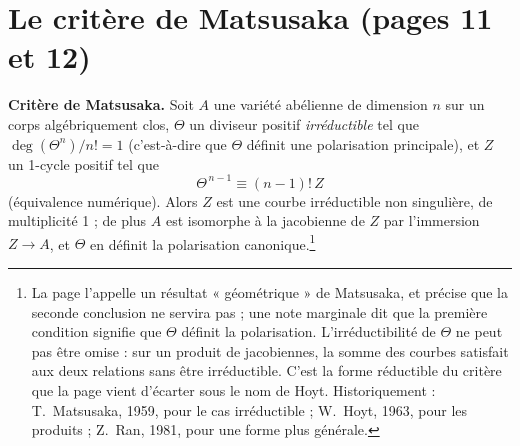 \documentclass[11pt,a4paper]{article}
\begin{document}
\section*{Le critère de Matsusaka (pages 11 et 12)}

\textbf{Critère de Matsusaka.} Soit $A$ une variété abélienne de dimension $n$
sur un corps algébriquement clos, $\Theta$ un diviseur positif
\emph{irréductible} tel que $\deg(\Theta^{n})/n! = 1$ (c'est-à-dire que
$\Theta$ définit une polarisation principale), et $Z$ un 1-cycle positif
tel que
\[
  \Theta^{\,n-1} \equiv (n-1)!\, Z
\]
(équivalence numérique). Alors $Z$ est une courbe irréductible non singulière,
de multiplicité 1 ; de plus $A$ est isomorphe à la jacobienne de $Z$ par
l'immersion $Z \to A$, et $\Theta$ en définit la polarisation
canonique.\footnote{La page l'appelle un résultat « géométrique » de
Matsusaka, et précise que la seconde conclusion ne servira pas ; une note
marginale dit que la première condition signifie que $\Theta$ définit la
polarisation. L'irréductibilité de $\Theta$ ne peut pas être omise : sur un
produit de jacobiennes, la somme des courbes satisfait aux deux relations sans
être irréductible. C'est la forme réductible du critère que la page vient
d'écarter sous le nom de Hoyt. Historiquement : T.~Matsusaka, 1959, pour le cas
irréductible ; W.~Hoyt, 1963, pour les produits ; Z.~Ran, 1981, pour une forme
plus générale.}
\end{document}
